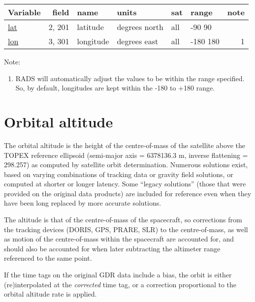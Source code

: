 \documentclass[a4paper,11pt,openany,natbib]{thesis}
\makeatletter
\newcommand\var[1]{\url{#1}\index{variables!#1@\protect\url{#1}}}
\newenvironment{vartable}{
\begin{table}[ht]
\small
\begin{tabular}{lrllllr}
\hline
Variable & field & name & units & sat & range & note \\
\hline
}{
\hline
\end{tabular}
\end{table}
}
\makeatother
\begin{document}
\begin{vartable}
\var{lat} & 2, 201 & latitude & degrees north & all & -90 90 & \\
\var{lon} & 3, 301 & longitude & degrees east & all & -180 180 & 1 \\
\end{vartable}
Note:
\begin{enumerate}
\item RADS will automatically adjust the values to be within the range specified. So, by default, longitudes are kept within the -180 to +180 range.
\end{enumerate}

\section{Orbital altitude}\label{var:alt}
The orbital altitude is the height of the centre-of-mass of the satellite above the TOPEX reference ellipsoid (semi-major axis = 6378136.3 m, inverse flattening = 298.257) as computed by satellite orbit determination. Numerous solutions exist, based on varying combinations of tracking data or gravity field solutions, or computed at shorter or longer latency. Some ``legacy solutions'' (those that were provided on the original data products) are included for reference even when they have been long replaced by more accurate solutions.

The altitude is that of the centre-of-mass of the spacecraft, so corrections from the tracking devices (DORIS, GPS, PRARE, SLR) to the centre-of-mass, as well as motion of the centre-of-mass within the spacecraft are accounted for, and should also be accounted for when later subtracting the altimeter range referenced to the same point.

If the time tags on the original GDR data include a bias, the orbit is either (re)interpolated at the \emph{corrected} time tag, or a correction proportional to the orbital altitude rate is applied.
\end{document}
